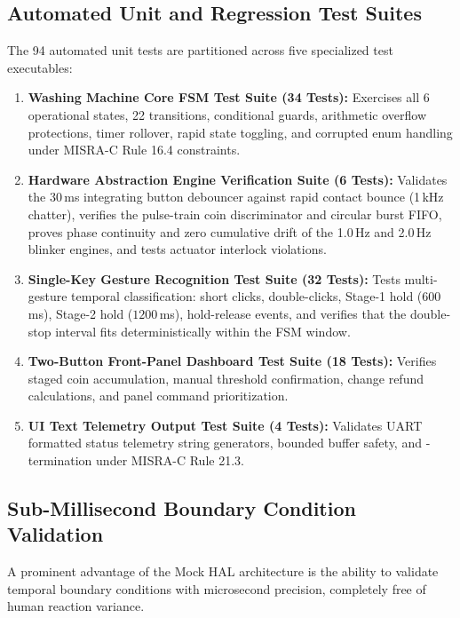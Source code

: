 \subsection{Automated Unit and Regression Test Suites}

The 94 automated unit tests are partitioned across five specialized test executables:
\begin{enumerate}
  \item \textbf{Washing Machine Core FSM Test Suite (34 Tests):}
        Exercises all 6 operational states, 22 transitions, conditional guards, arithmetic overflow protections, timer rollover, rapid state toggling, and corrupted enum handling under MISRA-C Rule 16.4 constraints.
  \item \textbf{Hardware Abstraction Engine Verification Suite (6 Tests):}
        Validates the 30\,ms integrating button debouncer against rapid contact bounce (1\,kHz chatter), verifies the pulse-train coin discriminator and circular burst FIFO, proves phase continuity and zero cumulative drift of the 1.0\,Hz and 2.0\,Hz blinker engines, and tests actuator interlock violations.
  \item \textbf{Single-Key Gesture Recognition Test Suite (32 Tests):}
        Tests multi-gesture temporal classification: short clicks, double-clicks, Stage-1 hold ($600$\,ms), Stage-2 hold ($1200$\,ms), hold-release events, and verifies that the double-stop interval fits deterministically within the FSM window.
  \item \textbf{Two-Button Front-Panel Dashboard Test Suite (18 Tests):}
        Verifies staged coin accumulation, manual threshold confirmation, change refund calculations, and panel command prioritization.
  \item \textbf{UI Text Telemetry Output Test Suite (4 Tests):}
        Validates UART formatted status telemetry string generators, bounded buffer safety, and -termination under MISRA-C Rule 21.3.
\end{enumerate}

\subsection{Sub-Millisecond Boundary Condition Validation}

A prominent advantage of the Mock HAL architecture is the ability to validate temporal boundary conditions with microsecond precision, completely free of human reaction variance.


